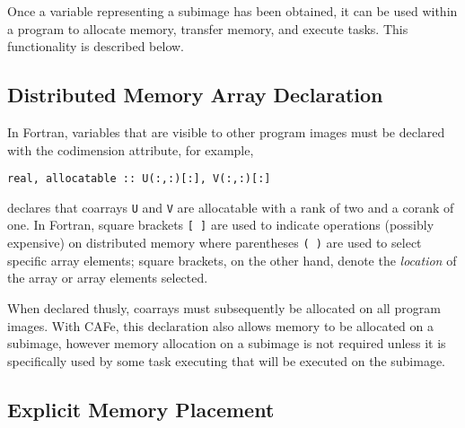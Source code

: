 Once a variable representing a subimage has been obtained, it can be used within a program
to allocate memory, transfer memory, and execute tasks.  This functionality is described below.


\subsection{Distributed Memory Array Declaration}

In Fortran, variables that are visible to other program images must be declared with the
codimension attribute, for example,
\begin{verbatim}
real, allocatable :: U(:,:)[:], V(:,:)[:]
\end{verbatim}
declares that coarrays \texttt{U} and \texttt{V} are allocatable with a rank of two and a
corank of one.  In Fortran, square brackets \texttt{[ ]} are used to indicate operations
(possibly expensive) on distributed memory where parentheses \texttt{( )} are used to
select specific array elements; square brackets, on the other hand, denote the
\emph{location} of the array or array elements selected.

When declared thusly, coarrays must subsequently be allocated on all program images.  With
CAFe, this declaration also allows memory to be allocated on a subimage, however memory
allocation on a subimage is not required unless it is specifically used by some task
executing that will be executed on the subimage.


\subsection{Explicit Memory Placement}

